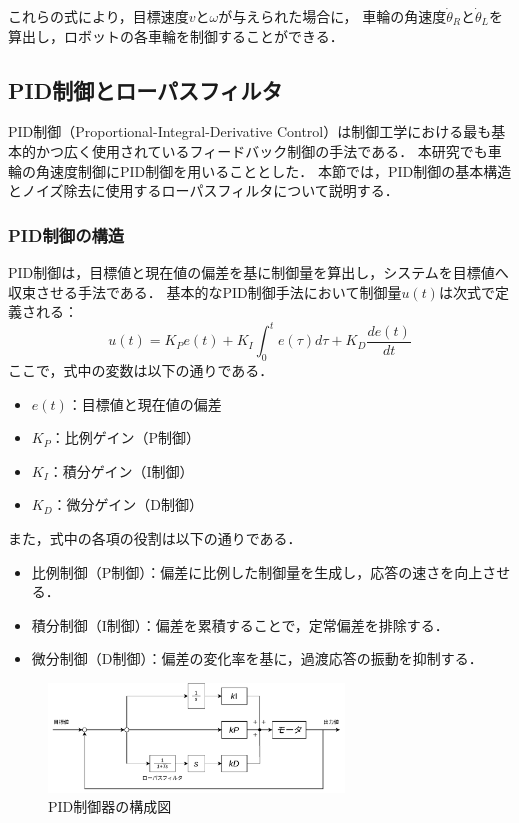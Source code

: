 これらの式により，目標速度$v$と$\omega$が与えられた場合に，
車輪の角速度$\dot{\theta}_R$と$\dot{\theta}_L$を算出し，ロボットの各車輪を制御することができる．

\subsection{PID制御とローパスフィルタ}
PID制御（Proportional-Integral-Derivative Control）は制御工学における最も基本的かつ広く使用されているフィードバック制御の手法である．
本研究でも車輪の角速度制御にPID制御を用いることとした．
本節では，PID制御の基本構造とノイズ除去に使用するローパスフィルタについて説明する．


\subsubsection{PID制御の構造}
PID制御は，目標値と現在値の偏差を基に制御量を算出し，システムを目標値へ収束させる手法である．
基本的なPID制御手法において制御量$u(t)$は次式で定義される：
\begin{equation}
    u(t) = K_P e(t) + K_I \int_{0}^{t} e(\tau) d\tau + K_D \frac{de(t)}{dt}
    \label{eq:pid}
\end{equation}
ここで，式中の変数は以下の通りである．
\begin{itemize}
    \item $e(t)$：目標値と現在値の偏差
    \item $K_P$：比例ゲイン（P制御）
    \item $K_I$：積分ゲイン（I制御）
    \item $K_D$：微分ゲイン（D制御）
\end{itemize}
また，式中の各項の役割は以下の通りである．
\begin{itemize}
    \item 比例制御（P制御）：偏差に比例した制御量を生成し，応答の速さを向上させる．
    \item 積分制御（I制御）：偏差を累積することで，定常偏差を排除する．
    \item 微分制御（D制御）：偏差の変化率を基に，過渡応答の振動を抑制する．
\end{itemize}

\begin{figure}[h]
    \centering
    \includegraphics[width=0.7\textwidth]{figure/pid.pdf}
    \caption{PID制御器の構成図}
    \label{fig:pid_controller}
\end{figure}

